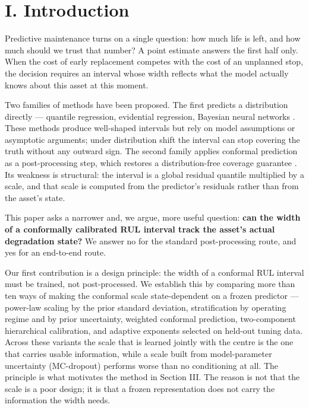 \section{I. Introduction}\label{i.-introduction}

Predictive maintenance turns on a single question: how much life is left, and how much should we trust that number? A point estimate answers the first half only. When the cost of early replacement competes with the cost of an unplanned stop, the decision requires an interval whose width reflects what the model actually knows about this asset at this moment.

Two families of methods have been proposed. The first predicts a distribution directly --- quantile regression, evidential regression, Bayesian neural networks \citep{frizzo2025, ly2025, hou2025, barry2026}. These methods produce well-shaped intervals but rely on model assumptions or asymptotic arguments; under distribution shift the interval can stop covering the truth without any outward sign. The second family applies conformal prediction as a post-processing step, which restores a distribution-free coverage guarantee \citep{barber2023, romano2019}. Its weakness is structural: the interval is a global residual quantile multiplied by a scale, and that scale is computed from the predictor's residuals rather than from the asset's state.

This paper asks a narrower and, we argue, more useful question: \textbf{can the width of a conformally calibrated RUL interval track the asset's actual degradation state?} We answer no for the standard post-processing route, and yes for an end-to-end route.

Our first contribution is a design principle: the width of a conformal RUL interval must be trained, not post-processed. We establish this by comparing more than ten ways of making the conformal scale state-dependent on a frozen predictor --- power-law scaling by the prior standard deviation, stratification by operating regime and by prior uncertainty, weighted conformal prediction, two-component hierarchical calibration, and adaptive exponents selected on held-out tuning data. Across these variants the scale that is learned jointly with the centre is the one that carries usable information, while a scale built from model-parameter uncertainty (MC-dropout) performs worse than no conditioning at all. The principle is what motivates the method in Section III. The reason is not that the scale is a poor design; it is that a frozen representation does not carry the information the width needs.

